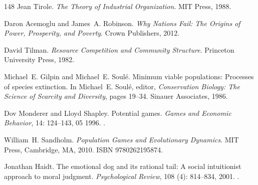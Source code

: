 \documentclass[11pt]{article}
\theoremstyle{plain}
\theoremstyle{definition}
\theoremstyle{remark}
\begin{document}
\begin{thebibliography}{148}
Jean Tirole.
\newblock \emph{The Theory of Industrial Organization}.
\newblock MIT Press, 1988.

Daron Acemoglu and James~A. Robinson.
\newblock \emph{Why Nations Fail: The Origins of Power, Prosperity, and
  Poverty}.
\newblock Crown Publishers, 2012.

David Tilman.
\newblock \emph{Resource Competition and Community Structure}.
\newblock Princeton University Press, 1982.

Michael~E. Gilpin and Michael~E. Soul{\'e}.
\newblock Minimum viable populations: Processes of species extinction.
\newblock In Michael~E. Soul{\'e}, editor, \emph{Conservation Biology: The
  Science of Scarcity and Diversity}, pages 19--34. Sinauer Associates, 1986.

Dov Monderer and Lloyd Shapley.
\newblock Potential games.
\newblock \emph{Games and Economic Behavior}, 14: 124--143, 05 1996.
\newblock {}.

William~H. Sandholm.
\newblock \emph{Population Games and Evolutionary Dynamics}.
\newblock MIT Press, Cambridge, MA, 2010.
\newblock ISBN 9780262195874.

Jonathan Haidt.
\newblock The emotional dog and its rational tail: A social intuitionist
  approach to moral judgment.
\newblock \emph{Psychological Review}, 108 (4): 814--834,
  2001.
\newblock {}.

\end{thebibliography}
\end{document}
